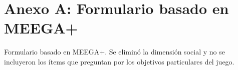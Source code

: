 \chapter{Anexo A: Formulario basado en MEEGA+} \label{AnexoA}


\begin{table}[h]
\centering
\caption{Formulario basado en MEEGA+. Se eliminó la dimensión social y no se incluyeron los ítems que preguntan por los objetivos particulares del juego.}
\label{TablaFormularioMEEGA}






\end{table}

